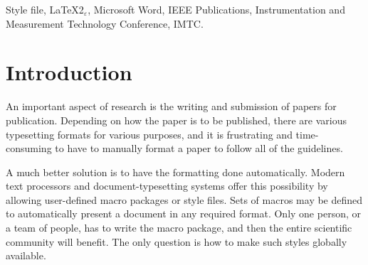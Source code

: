 \documentclass[%
	final,
	reprint,
	notitlepage,
	narroweqnarray,
	inline,
	twoside,
        invited,
	]{ieee}
\newcommand{\latexiie}{\LaTeX2{\Large$_\varepsilon$}}
\begin{document}
\begin{abstract} 
Our premise is that a researcher should be able to use his or her time
doing research, and not fighting with a text formatter. Modern
formatters have macro capability. If the proper macros are written,
the text formatting for all IEEE publications may be accomplished
automatically.  We propose that proponents of various text-processing
systems write macro packages for their own systems.  The scientific
community would benefit greatly.  One example is provided for users of
the \latexiie\ system. It is available at
\mbox{http://www--isl.stanford.edu/ieee/} or at the ftp site
\mbox{ftp://isl.stanford.edu/pub/ieee/}. A sim\-i\-lar macro package
is being developed for users of Microsoft Word, and can be found at
the world-wide-web addresses given in the Conclusion.
\end{abstract}

\begin{keywords}
Style file, \latexiie, Microsoft Word, IEEE Publications, Instrumentation
and Measurement Technology Conference, IMTC.
\end{keywords}

\section{Introduction}

\PARstart An important aspect of research is the writing and
submission of papers for publication. Depending on how the paper is to
be published, there are various typesetting formats for various
purposes, and it is frustrating and time-consuming to have to manually
format a paper to follow all of the guidelines.

A much better solution is to have the formatting done automatically.
Modern text processors and document-typesetting systems offer this
possibility by allowing user-defined macro packages or style files.
Sets of macros may be defined to automatically present a document in
any required format. Only one person, or a team of people, has to
write the macro package, and then the entire scientific community will
benefit. The only question is how to make such styles globally
available.
\end{document}
